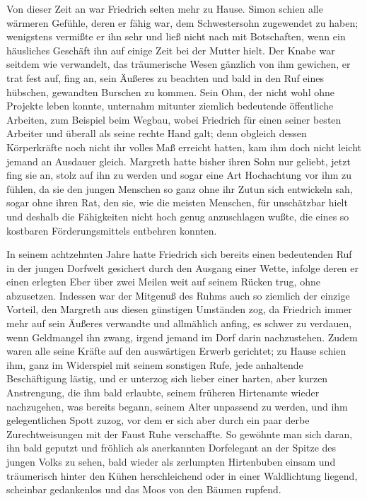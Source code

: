 Von dieser Zeit an war Friedrich selten mehr zu Hause. Simon schien alle wärmeren Gefühle, deren er fähig war, dem Schwestersohn zugewendet zu haben; wenigstens vermißte er ihn sehr und ließ nicht nach mit Botschaften, wenn ein häusliches Geschäft ihn auf einige Zeit bei der Mutter hielt. Der Knabe war seitdem wie verwandelt, das träumerische Wesen gänzlich von ihm gewichen, er trat fest auf, fing an, sein Äußeres zu beachten und bald in den Ruf eines hübschen, gewandten Burschen zu kommen. Sein Ohm, der nicht wohl ohne Projekte leben konnte, unternahm mitunter ziemlich bedeutende öffentliche Arbeiten, zum Beispiel beim Wegbau, wobei Friedrich für einen seiner besten Arbeiter und überall als seine rechte Hand galt; denn obgleich dessen Körperkräfte noch nicht ihr volles Maß erreicht hatten, kam ihm doch nicht leicht jemand an Ausdauer gleich. Margreth hatte bisher ihren Sohn nur geliebt, jetzt fing sie an, stolz auf ihn zu werden und sogar eine Art Hochachtung vor ihm zu fühlen, da sie den jungen Menschen so ganz ohne ihr Zutun sich entwickeln sah, sogar ohne ihren Rat, den sie, wie die meisten Menschen, für unschätzbar hielt und deshalb die Fähigkeiten nicht hoch genug anzuschlagen wußte, die eines so kostbaren Förderungsmittels entbehren konnten.

In seinem achtzehnten Jahre hatte Friedrich sich bereits einen bedeutenden Ruf in der jungen Dorfwelt gesichert durch den Ausgang einer Wette, infolge deren er einen erlegten Eber über zwei Meilen weit auf seinem Rücken trug, ohne abzusetzen. Indessen war der Mitgenuß des Ruhms auch so ziemlich der einzige Vorteil, den Margreth aus diesen günstigen Umständen zog, da Friedrich immer mehr auf sein Äußeres verwandte und allmählich anfing, es schwer zu verdauen, wenn Geldmangel ihn zwang, irgend jemand im Dorf darin nachzustehen. Zudem waren alle seine Kräfte auf den auswärtigen Erwerb gerichtet; zu Hause schien ihm, ganz im Widerspiel mit seinem sonstigen Rufe, jede anhaltende Beschäftigung lästig, und er unterzog sich lieber einer harten, aber kurzen Anstrengung, die ihm bald erlaubte, seinem früheren Hirtenamte wieder nachzugehen, was bereits begann, seinem Alter unpassend zu werden, und ihm gelegentlichen Spott zuzog, vor dem er sich aber durch ein paar derbe Zurechtweisungen mit der Faust Ruhe verschaffte. So gewöhnte man sich daran, ihn bald geputzt und fröhlich als anerkannten Dorfelegant an der Spitze des jungen Volks zu sehen, bald wieder als zerlumpten Hirtenbuben einsam und träumerisch hinter den Kühen herschleichend oder in einer Waldlichtung liegend, scheinbar gedankenlos und das Moos von den Bäumen rupfend.

